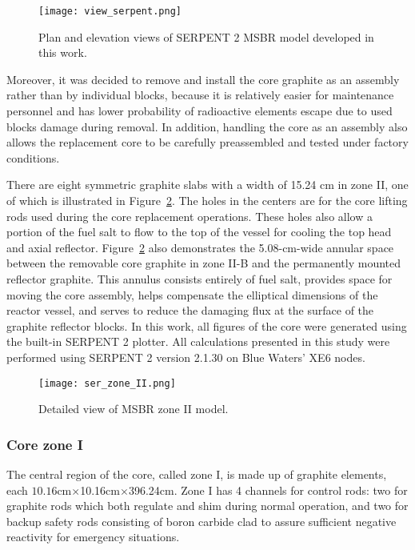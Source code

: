 \begin{figure}[hbp!] %
  \centering
  \texttt{[image: view\_serpent.png]}
  \caption{Plan and elevation views of SERPENT 2 \gls{MSBR} model developed in 
this work.}
  \label{fig:serpent_plan_view}
\end{figure}

Moreover, it was decided to remove and install the core graphite as an assembly 
rather than by individual blocks, because it is relatively easier for 
maintenance personnel and has lower probability of radioactive elements escape 
due to used blocks damage during removal. In addition, handling the core as an 
assembly also allows the replacement core to be carefully preassembled and 
tested under factory conditions.

There are eight symmetric graphite slabs with a width of 15.24 cm in zone II, 
one of which is illustrated in Figure~\ref{fig:serpent_zoneII}. The holes in the 
centers are for the core lifting rods used during the core replacement 
operations. These holes also allow a portion of the fuel salt to flow to the top 
of the vessel for cooling the top head and axial reflector. 
Figure~\ref{fig:serpent_zoneII} also demonstrates the 5.08-cm-wide annular space 
between the removable core graphite in zone II-B and the permanently mounted 
reflector graphite. This annulus consists entirely of fuel salt, provides space 
for moving the core assembly, helps compensate the elliptical dimensions of the 
reactor vessel, and serves to reduce the damaging flux at the surface of the 
graphite reflector blocks. In this work, all figures of the core were generated 
using the built-in SERPENT 2 plotter. All calculations presented in this study 
were performed using SERPENT 2 version 2.1.30 on Blue Waters’ XE6 nodes. 

\begin{figure}[t!] %
  \centering
  \texttt{[image: ser\_zone\_II.png]}
  \caption{Detailed view of \gls{MSBR} zone II model.}
  \label{fig:serpent_zoneII}
\end{figure}

\subsubsection{Core zone I}
The central region of the core, called zone I, is made up of graphite elements, 
each $10.16$cm$\times$10.16cm$\times$396.24cm. Zone I has 4 channels for control 
rods: two for graphite rods which both regulate and shim during normal 
operation, and two for backup safety rods consisting of boron carbide clad to 
assure sufficient negative reactivity for emergency situations.

